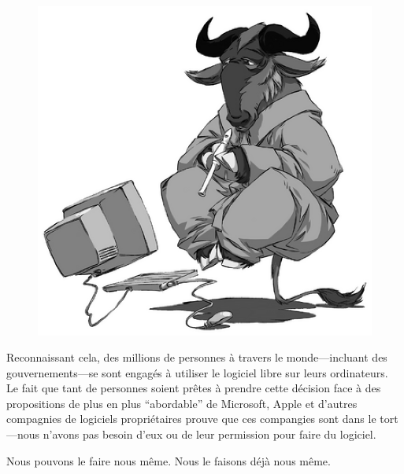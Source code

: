 \documentclass[12pt]{article}
\begin{document}
\begin{figure}
  \vspace{-0.25in}
  \begin{center}
    \includegraphics[scale=0.45]{gnu-think-smaller.eps}
  \end{center}
\end{figure}

Reconnaissant cela, des millions de personnes à travers le monde---incluant des
gouvernements---se sont engagés à utiliser le logiciel libre sur leurs
ordinateurs. Le fait que tant de personnes soient prêtes à prendre cette
décision face à des propositions de plus en plus ``abordable'' de Microsoft,
Apple et d'autres compagnies de logiciels propriétaires prouve que ces
compangies sont dans le tort---nous n'avons pas besoin d'eux ou de leur
permission pour faire du logiciel.


Nous pouvons le faire nous même. Nous le faisons déjà nous même.
\end{document}
